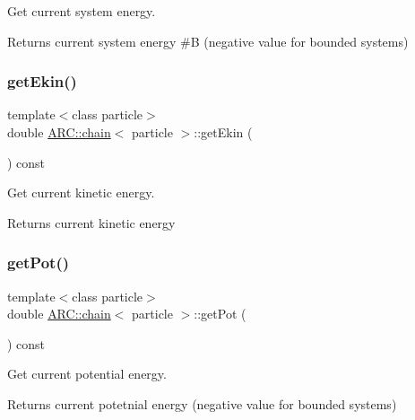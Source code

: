 Get current system energy. 

\begin{DoxyReturn}{Returns}
current system energy \#B (negative value for bounded systems) 
\end{DoxyReturn}
\hypertarget{classARC_1_1chain_ad7e8b3a20521f095a6935845f8a2ee53}{}\label{classARC_1_1chain_ad7e8b3a20521f095a6935845f8a2ee53} 
\subsubsection{\texorpdfstring{get\+Ekin()}{getEkin()}}
{\footnotesize\ttfamily template$<$class particle$>$ \\
double \hyperlink{classARC_1_1chain}{A\+R\+C\+::chain}$<$ particle $>$\+::get\+Ekin (\begin{DoxyParamCaption}{ }\end{DoxyParamCaption}) const\hspace{0.3cm}{\ttfamily [inline]}}



Get current kinetic energy. 

\begin{DoxyReturn}{Returns}
current kinetic energy 
\end{DoxyReturn}
\hypertarget{classARC_1_1chain_ae59c00c676af34f22c650076eb0aa83a}{}\label{classARC_1_1chain_ae59c00c676af34f22c650076eb0aa83a} 
\subsubsection{\texorpdfstring{get\+Pot()}{getPot()}}
{\footnotesize\ttfamily template$<$class particle$>$ \\
double \hyperlink{classARC_1_1chain}{A\+R\+C\+::chain}$<$ particle $>$\+::get\+Pot (\begin{DoxyParamCaption}{ }\end{DoxyParamCaption}) const\hspace{0.3cm}{\ttfamily [inline]}}



Get current potential energy. 

\begin{DoxyReturn}{Returns}
current potetnial energy (negative value for bounded systems) 
\end{DoxyReturn}
\hypertarget{classARC_1_1chain_a48bde99d89b99df54844e1331d4814bb}{}\label{classARC_1_1chain_a48bde99d89b99df54844e1331d4814bb} 
